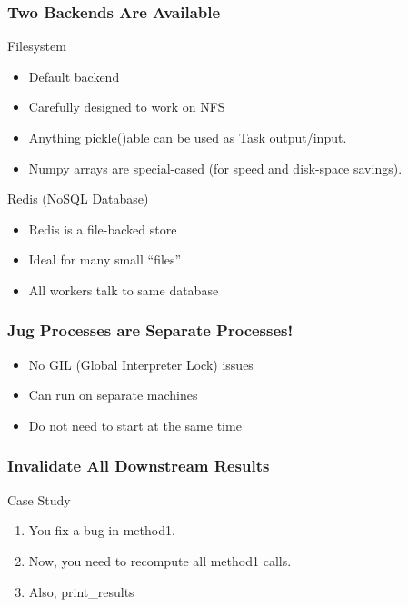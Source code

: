 \documentclass{beamer}
\begin{document}
\begin{frame}[fragile]
\frametitle{Two Backends Are Available}
\begin{block}{Filesystem}
\begin{itemize}
\item Default backend
\item Carefully designed to work on NFS
\item Anything pickle()able can be used as Task output/input.
\item Numpy arrays are special-cased (for speed and disk-space savings).
\end{itemize}
\end{block}

\begin{block}{Redis (NoSQL Database)}
\begin{itemize}
\item Redis is a file-backed store
\item Ideal for many small ``files''
\item All workers talk to same database
\end{itemize}
\end{block}

\end{frame}

\begin{frame}[fragile]
\frametitle{Jug Processes are Separate Processes!}
\begin{itemize}
\item \alert{No GIL (Global Interpreter Lock)} issues
\item Can run on \alert{separate machines}
\item Do not need to start at the same time
\end{itemize}
\end{frame}


\begin{frame}[fragile]
\frametitle{Invalidate All Downstream Results}
\begin{block}{Case Study}
\begin{enumerate}
\item You fix a bug in \alert{method1}.
\item Now, you need to recompute all \alert{method1} calls.
\item Also, \alert{print\_results}
\end{enumerate}
\end{block}
\end{frame}
\end{document}

